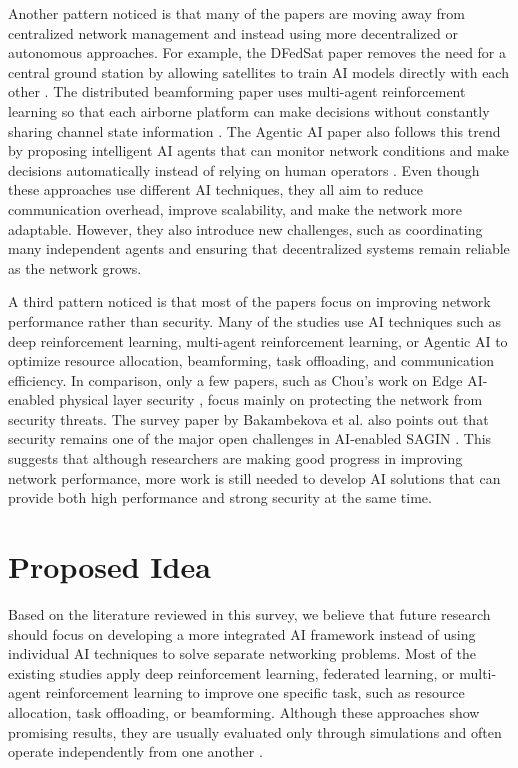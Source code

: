 \documentclass[letterpaper]{article} %
\begin{document}
Another pattern noticed is that many of the papers are moving away from centralized network management and instead using more decentralized or autonomous approaches. For example, the DFedSat paper removes the need for a central ground station by allowing satellites to train AI models directly with each other \citep{yang2024dfedsat}. The distributed beamforming paper uses multi-agent reinforcement learning so that each airborne platform can make decisions without constantly sharing channel state information \citep{khoshkbari2025distributed}. The Agentic AI paper also follows this trend by proposing intelligent AI agents that can monitor network conditions and make decisions automatically instead of relying on human operators \citep{dev2025advanced}. Even though these approaches use different AI techniques, they all aim to reduce communication overhead, improve scalability, and make the network more adaptable. However, they also introduce new challenges, such as coordinating many independent agents and ensuring that decentralized systems remain reliable as the network grows.

A third pattern noticed is that most of the papers focus on improving network performance rather than security. Many of the studies use AI techniques such as deep reinforcement learning, multi-agent reinforcement learning, or Agentic AI to optimize resource allocation, beamforming, task offloading, and communication efficiency. In comparison, only a few papers, such as Chou's work on Edge AI-enabled physical layer security \citep{chou2024edge}, focus mainly on protecting the network from security threats. The survey paper by Bakambekova et al. also points out that security remains one of the major open challenges in AI-enabled SAGIN \citep{bakambekova2024interplay}. This suggests that although researchers are making good progress in improving network performance, more work is still needed to develop AI solutions that can provide both high performance and strong security at the same time.


\section{Proposed Idea}

Based on the literature reviewed in this survey, we believe that future research should focus on developing a more integrated AI framework instead of using individual AI techniques to solve separate networking problems. Most of the existing studies apply deep reinforcement learning, federated learning, or multi-agent reinforcement learning to improve one specific task, such as resource allocation, task offloading, or beamforming. Although these approaches show promising results, they are usually evaluated only through simulations and often operate independently from one another \citep{huang2024joint,qin2024differentiated,zhang2024management}.
\end{document}
